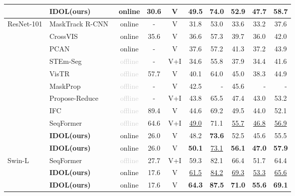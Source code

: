 \documentclass[runningheads]{llncs}
\newcommand{\gray}[1]{\textcolor{lightgray}{#1}}
\begin{document}
\begin{table}[t]
\begin{center}
{\begin{tabular}{llcccccccc}
 &\textbf{IDOL(ours)}    &{online} &30.6 &V   &\textbf{49.5} &\textbf{74.0} &\textbf{52.9} &\textbf{47.7} &\textbf{58.7} \\  
 \midrule
 \multirow{11}{*}{ResNet-101}
 &MaskTrack R-CNN~\cite{MaskTrackRCNN}     &{online} &- &V  &31.8 &53.0 &33.6 &33.2 &37.6  \\
  &CrossVIS~\cite{CrossVIS}      &{online} &35.6 &V  &36.6 &57.3 &39.7 &36.0 &42.0 \\
 &PCAN~\cite{PCAN}  &{online} &- &V  &37.6 &57.2 &41.3 &37.2 &43.9   \\
 &STEm-Seg~\cite{STEmSEG}     &\gray{offline} &- &V+I  &34.6 &55.8 &37.9 &34.4 &41.6 \\
 &VisTR~\cite{VisTR}     &\gray{offline} &57.7 &V   &40.1 &64.0 &45.0 &38.3 &44.9  \\
&MaskProp~\cite{MaskProp}     &\gray{offline} &- &V   &42.5 &\ \ \  -   &45.6 &\ \ \  -   &\ \ \  -   \\  
 &Propose-Reduce~\cite{ProposeReduce}     &\gray{offline} &- &V+I  &43.8 &65.5 &47.4 &43.0 &53.2  \\
 &IFC~\cite{IFC}   &\gray{offline} &89.4 &V  &44.6 &69.2 &49.5 &44.0 &52.1  \\  
 &{SeqFormer}~\cite{seqformer}  & \gray{offline} &64.6 &V+I   &\underline{49.0} &{71.1} &\underline{55.7}   &\underline{46.8}  &\underline{56.9}  \\  
 &\textbf{IDOL(ours)}    &online &26.0 &V  &{48.2} &\textbf{73.6} &{52.5} &{45.6} &{55.5}  \\  
  &\textbf{IDOL(ours)}    &online &26.0 &V  &\textbf{50.1} &\underline{73.1} &\textbf{56.1} &\textbf{47.0} &\textbf{57.9}  \\  
 \midrule
 \multirow{3}{*}{Swin-L}
  &SeqFormer~\cite{seqformer}     &\gray{offline} &27.7 &V+I   &{59.3}  &{82.1}  &{66.4}  &{51.7}  &64.4 \\ 
   &\textbf{IDOL(ours)}    &{online} &17.6 &V   &\underline{61.5} &\underline{84.2} &\underline{69.3} &\underline{53.3} &\underline{65.6} \\  
   &\textbf{IDOL(ours)}    &{online} &17.6 &V   &\textbf{64.3} &\textbf{87.5} &\textbf{71.0} &\textbf{55.6} &\textbf{69.1} \\  
\hline
\end{tabular}
}
\end{center}
\vspace{-2em}
\end{table}
\end{document}
